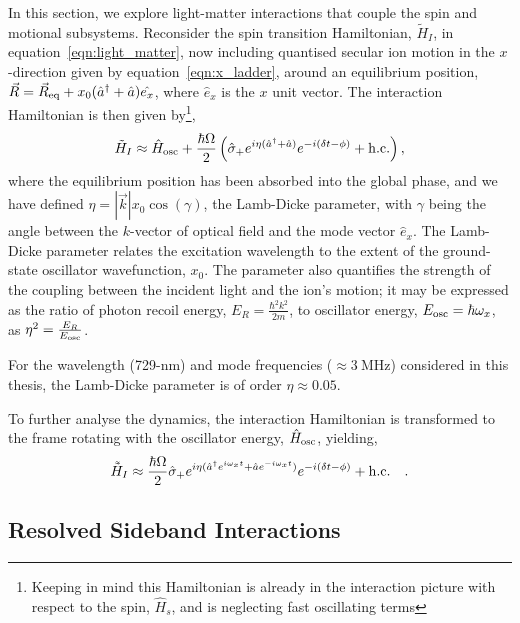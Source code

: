 In this section, we explore light-matter interactions that couple the spin and motional subsystems.
Reconsider the spin transition Hamiltonian, $\tilde H_I$, in equation~\ref{eqn:light_matter}, now including quantised secular ion motion in the $x$-direction given by equation~\ref{eqn:x_ladder}, around an equilibrium position, $\vec R = \vec R_{\rm eq} + x_0(\hat a^\dagger + \hat a)\hat{e_x}$, where $\hat e_x$ is the $x$ unit vector.
The interaction Hamiltonian is then given by\footnote{Keeping in mind this Hamiltonian is already in the interaction picture with respect to the spin, $\hat H_s$, and is neglecting fast oscillating terms},
\begin{equation}
    \tilde H_I \approx \hat H_{\rm osc} + \frac{\hbar\Omega}{2}\left(\hat\sigma_+ e^{i\eta(\hat a^\dagger+\hat a )}e^{-i(\delta t - \phi)} + {\rm h.c.} \right),
\end{equation}
where the equilibrium position has been absorbed into the global phase, and we
have defined $\eta = |\vec k|x_0\cos(\gamma)$, the Lamb-Dicke parameter, with $\gamma$
being the angle between the $k$-vector of optical field and the mode vector $\hat e_x$. 
The Lamb-Dicke parameter relates the excitation wavelength to the extent
of the ground-state oscillator wavefunction, $x_0$. The parameter also quantifies the
strength of the coupling between the incident light and the ion's motion; it may be expressed as the ratio of photon recoil energy, $E_R=\frac{\hbar^2 k^2}{2m}$, to oscillator energy,
$E_{\rm osc}=\hbar\omega_x$, as $\eta^2 = \frac{E_R}{E_{\rm osc}}$.

For the wavelength (729-nm) and mode frequencies ($\approx 3~\unit{\mega\hertz}$) considered in this thesis, the Lamb-Dicke parameter is of order $\eta \approx 0.05$.

To further analyse the dynamics, the interaction Hamiltonian is transformed to the frame rotating with the oscillator energy, $\hat H_{\rm osc}$, yielding,
\begin{equation}
    \vardbtilde H_I \approx \frac{\hbar\Omega}{2}\hat\sigma_+ e^{i\eta(\hat a^\dagger e^{i\omega_x t}+\hat a e^{-i\omega_x t} )}e^{-i(\delta t - \phi)} + {\rm h.c.} ~~~.
\end{equation}


\subsection{Resolved Sideband Interactions}
\label{sec:resolved_sidebands}

